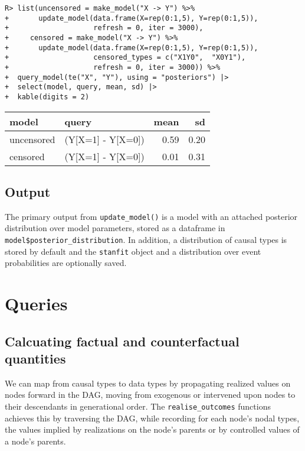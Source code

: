 \documentclass[
  11pt,
  article]{jss}
\begin{document}
\begin{verbatim}
R> list(uncensored = make_model("X -> Y") %>%
+       update_model(data.frame(X=rep(0:1,5), Y=rep(0:1,5)),
+                    refresh = 0, iter = 3000),
+     censored = make_model("X -> Y") %>%
+       update_model(data.frame(X=rep(0:1,5), Y=rep(0:1,5)),
+                    censored_types = c("X1Y0",  "X0Y1"),
+                    refresh = 0, iter = 3000)) %>%
+  query_model(te("X", "Y"), using = "posteriors") |>
+  select(model, query, mean, sd) |>
+  kable(digits = 2)
\end{verbatim}

\begin{tabular}{l|l|r|r}
\hline
model & query & mean & sd\\
\hline
uncensored & (Y[X=1] - Y[X=0]) & 0.59 & 0.20\\
\hline
censored & (Y[X=1] - Y[X=0]) & 0.01 & 0.31\\
\hline
\end{tabular}

\hypertarget{output}{%
\subsection{Output}\label{output}}

The primary output from \texttt{update\_model()} is a model with an
attached posterior distribution over model parameters, stored as a
dataframe in \texttt{model\$posterior\_distribution}. In addition, a
distribution of causal types is stored by default and the
\texttt{stanfit} object and a distribution over event probabilities are
optionally saved.

\hypertarget{sec-query}{%
\section{Queries}\label{sec-query}}

\hypertarget{sec-propagation}{%
\subsection{Calcuating factual and counterfactual
quantities}\label{sec-propagation}}

We can map from causal types to data types by propagating realized
values on nodes forward in the DAG, moving from exogenous or intervened
upon nodes to their descendants in generational order. The
\texttt{realise\_outcomes} functions achieves this by traversing the
DAG, while recording for each node's nodal types, the values implied by
realizations on the node's parents or by controlled values of a node's
parents.
\end{document}
